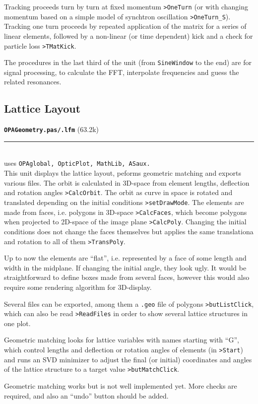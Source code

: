 \documentclass[12pt]{article}
\newcommand\code[1]{{\tt #1}}
\newcommand{\todo}[1]{{\color{red} #1}}
\newcommand\opamodule[3]{{\bf \tt #1} #2\\  \rule[3pt]{\textwidth}{0.2pt} \\ {\scriptsize uses \tt  #3}\\[1ex]}
\begin{document}
Tracking proceeds turn by turn at fixed momentum \code{>OneTurn} (or with changing momentum based on a simple model of synchtron oscillation \code{>OneTurn\_S}). Tracking one turn proceeds by repeated application of the matrix for a series of linear elements, followed by a non-linear (or time dependent) kick and a check for particle loss \code{>TMatKick}.

The procedures in the last third of the unit (from {\tt SineWindow} to the end) are for signal processing, to calculate the FFT, interpolate frequencies and guess the related resonances.\\

\subsection{Lattice Layout}
\opamodule{OPAGeometry.pas/.lfm}{(63.2k)}{OPAglobal, OpticPlot, MathLib, ASaux.}
This unit displays the lattice layout, peforms geometric matching and exports various files.
The orbit is calculated in 3D-space from element lengths, deflection and rotation angles \code{>CalcOrbit}. The orbit as curve in space is rotated and translated depending on the initial conditions \code{>setDrawMode}.
The elements are made from faces, i.e. polygons in 3D-space \code{>CalcFaces}, which become polygons when projected to 2D-space of the image plane \code{>CalcPoly}. Changing the initial conditions does not change the faces themselves but applies the same translationa and rotation to all of them \code{>TransPoly}.

\todo{Up to now the elements are ``flat'', i.e. represented by a face of some length and width in the midplane. If changing the initial angle, they look ugly. It would be straightforward to define boxes made from several faces, however this would also require some rendering algorithm for 3D-display.}

Several files can be exported, among them a \code{.geo} file of polygons \code{>butListClick}, which can also be read \code{>ReadFiles} in order to show several lattice structures in one plot.

Geometric matching looks for lattice variables with names starting with ``G'', which control lengths and deflection or rotation angles of elements (in \code{>Start}) and runs an SVD minimizer to adjust the final (or initial) coordinates and angles of the lattice structure to a target value \code{>butMatchClick}.

\todo{Geometric matching works but is not well implemented yet. More checks are required, and also an ``undo'' button should be added.}
\end{document}
